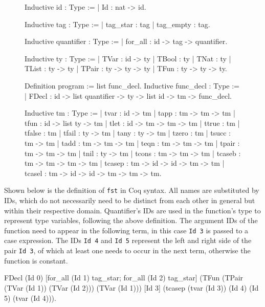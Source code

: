 \documentclass[paper = a4, fleqn, abstract=on, twoside]{scrreprt}
\newcommand{\coqinline}[1]{\texttt{#1}}
\begin{document}
\begin{figure}[H]
\begin{minipage}[t]{.5 \linewidth}
\begin{coqcode}
Inductive id : Type :=
| Id : nat -> id.

Inductive tag : Type :=
| tag_star  : tag
| tag_empty : tag.

Inductive quantifier : Type :=
| for_all : id -> tag -> quantifier.

Inductive ty : Type :=
| TVar  : id -> ty
| TBool : ty
| TNat  : ty
| TList : ty -> ty
| TPair : ty -> ty -> ty
| TFun  : ty -> ty -> ty.

Definition program := list func_decl.
Inductive func_decl : Type :=
| FDecl : id -> list quantifier -> ty -> list id -> tm -> func_decl.
\end{coqcode}
\end{minipage}
\begin{minipage}[t]{.5 \linewidth}
	\begin{coqcode}
Inductive tm : Type :=
  | tvar   : id -> tm
  | tapp   : tm -> tm -> tm
  | tfun   : id -> list ty -> tm
  | tlet   : id -> tm -> tm -> tm
  | ttrue  : tm
  | tfalse : tm
  | tfail  : ty -> tm
  | tany   : ty -> tm
  | tzero  : tm
  | tsucc  : tm -> tm
  | tadd   : tm -> tm -> tm
  | teqn   : tm -> tm -> tm
  | tpair  : tm -> tm -> tm
  | tnil   : ty -> tm
  | tcons  : tm -> tm -> tm
  | tcaseb : tm -> tm -> tm -> tm
  | tcasep : tm -> id -> id -> tm -> tm
  | tcasel : tm -> id -> id -> tm -> tm -> tm.
	\end{coqcode}
\end{minipage}
\end{figure}\noindent
Shown below is the definition of \texttt{fst} in Coq syntax. All names are substituted by IDs, which do not necessarily need to be distinct from each other in general but within their respective domain. Quantifier's IDs are used in the function's type to represent type variables, following the above definition. The argument IDs of the function need to appear in the following term, in this case \coqinline{Id 3} is passed to a case expression. The IDs \coqinline{Id 4} and \coqinline{Id 5} represent the left and right side of the pair \coqinline{Id 3}, of which at least one needs to occur in the next term, otherwise the function is constant.
\begin{coqcode}
FDecl (Id 0) 
      [for_all (Id 1) tag_star; for_all (Id 2) tag_star] 
      (TFun (TPair (TVar (Id 1)) (TVar (Id 2))) (TVar (Id 1)))
      [Id 3]
      (tcasep (tvar (Id 3)) (Id 4) (Id 5) (tvar (Id 4))).
\end{coqcode}
\end{document}

